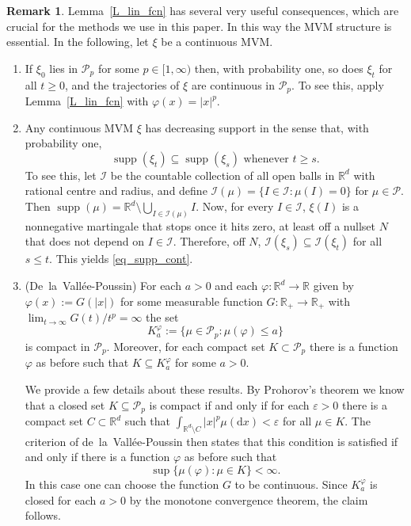 \documentclass{article}
\theoremstyle{definition}
\newtheorem{remark}[theorem]{\textbf{Remark}}
\numberwithin{equation}{section}
\numberwithin{theorem}{section}
\newcommand{\R}{\mathbb{R}}
\newcommand{\dx}{\mathrm{d}x}
\DeclareMathOperator{\supp}{supp}
\newcommand{\e}{\varepsilon}
\newcommand{\Ical}{{\mathcal I}}
\newcommand{\Pcal}{{\mathcal P}}
\begin{document}
\begin{remark} \label{rem:MVMCompact}
Lemma~\ref{L_lin_fcn} has several very useful consequences, which are crucial for the methods we use in this paper. In this way the MVM structure is essential. In the following, let $\xi$ be a continuous MVM.
\begin{enumerate}
\item\label{rem:MVMCompact_1} If $\xi_0$ lies in $\Pcal_p$ for some $p \in [1,\infty)$ then, with probability one, so does $\xi_t$ for all $t\ge0$, and the trajectories of $\xi$ are continuous in $\Pcal_p$. To see this, apply Lemma~\ref{L_lin_fcn} with $\varphi(x) = |x|^p$.
\item\label{it2iii} Any continuous MVM $\xi$ has decreasing support in the sense that, with probability one,
\begin{equation}\label{eq_supp_cont}
\text{$\supp(\xi_t)\subseteq\supp(\xi_s)$ whenever $t\ge s$.}
\end{equation}
To see this, let $\Ical$ be the countable collection of all open  balls in $\R^d$ with rational centre and radius, and define $\Ical(\mu)=\{I\in\Ical\colon \mu(I)=0\}$ for $\mu\in\Pcal$. Then $\supp(\mu)=\R^d\setminus\bigcup_{I\in\Ical(\mu)} I$. Now, for every $I\in\Ical$, $\xi(I)$ is a nonnegative martingale that stops once it hits zero, at least off a nullset $N$ that does not depend on $I\in\Ical$. Therefore, off $N$, $\Ical(\xi_s)\subseteq\Ical(\xi_t)$ for all $s\le t$. This yields \eqref{eq_supp_cont}.

\item\label{dlvp} (De~la~Vall\'ee-Poussin) For each $a>0$ and each $\varphi:\R^d\to \R$ given by
  $\varphi(x):=G(|x|)$ for some measurable function $G:\R_+\to\R_+$ with
  $\lim_{t\to\infty}G(t)/t^p=\infty$ the set 
\begin{equation}\label{eqn5}
K^\varphi_a:=\{\mu\in \Pcal_p\colon\mu(\varphi)\leq a\}
\end{equation}
is compact in $\Pcal_p$. Moreover, for each compact set $K\subset \Pcal_p$ there is a function $\varphi$ as before such that $K\subseteq K_a^\varphi$ for some $a>0$.

We provide a few details about these results. By Prohorov's theorem %
 we know that a closed set $K\subseteq \Pcal_p$ is compact if and only if for each $\e>0$ there is a compact set $C\subset \R^d$ such that $\int_{{\R^d}\setminus C} |x|^p\mu(\dx)<\e$ for all $\mu\in K$. The criterion of de~la~Vall\'ee-Poussin then states that this condition is satisfied if and only if there is a function $\varphi$ as before such that 
$$\sup\{\mu(\varphi)\colon \mu\in K\} < \infty.$$
In this case one can choose the function $G$ to be continuous. Since $K^\varphi_a$ is closed for each $a>0$ by the monotone convergence theorem, the claim follows.



\end{enumerate}
\end{remark}
\end{document}
